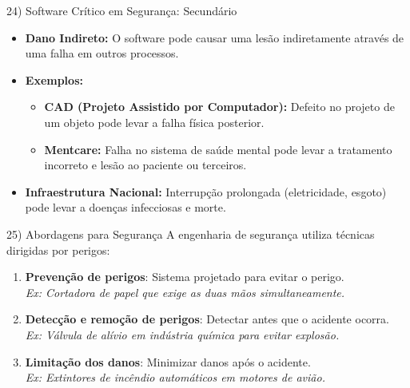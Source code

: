 \documentclass[aspectratio=169]{beamer}
\begin{document}
\begin{frame}{24) Software Crítico em Segurança: Secundário}
  \begin{itemize}
    \item \textbf{Dano Indireto:} O software pode causar uma lesão indiretamente através de uma falha em outros processos.
    \item \textbf{Exemplos:}
    \begin{itemize}
      \item \textbf{CAD (Projeto Assistido por Computador):} Defeito no projeto de um objeto pode levar a falha física posterior.
      \item \textbf{Mentcare:} Falha no sistema de saúde mental pode levar a tratamento incorreto e lesão ao paciente ou terceiros.
    \end{itemize}
    \item \textbf{Infraestrutura Nacional:} Interrupção prolongada (eletricidade, esgoto) pode levar a doenças infecciosas e morte.
  \end{itemize}
\end{frame}

\begin{frame}{25) Abordagens para Segurança}
  A engenharia de segurança utiliza técnicas dirigidas por perigos:
  
  \vspace{0.5em}
  \begin{enumerate}
    \item \textbf{Prevenção de perigos}: Sistema projetado para evitar o perigo. \\
    \textit{Ex: Cortadora de papel que exige as duas mãos simultaneamente.}
    \item \textbf{Detecção e remoção de perigos}: Detectar antes que o acidente ocorra. \\
    \textit{Ex: Válvula de alívio em indústria química para evitar explosão.}
    \item \textbf{Limitação dos danos}: Minimizar danos após o acidente. \\
    \textit{Ex: Extintores de incêndio automáticos em motores de avião.}
  \end{enumerate}
\end{frame}
\end{document}
